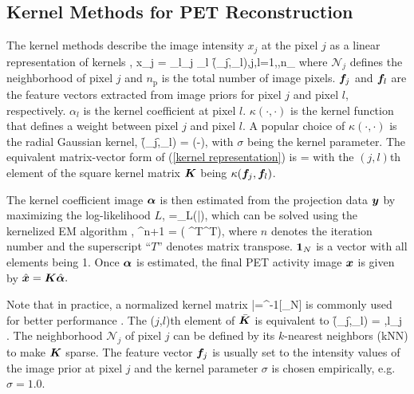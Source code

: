 \documentclass[]{IEEETran}
\newcommand{\np}{n_\mathrm{p}}
\begin{document}
	\subsection{Kernel Methods for PET Reconstruction}
	
	The kernel methods describe the image intensity $x_j$ at the pixel $j$ as a linear representation of kernels \cite{Wang2015},
	\beq
	x_j = \sum_{l\in {}_j} \alpha_l \kappa(\f_j,\f_l),\quad j,l=1,\cdots,\np
	\label{kernel representation}
	\eeq
	where $\mathcal{N}_j$ defines the neighborhood of pixel $j$ and $\np$ is the total number of image pixels. $\bm{f}_j$ and $\bm{f}_l$ are the feature vectors extracted from image priors for pixel $j$ and pixel $l$, respectively.  $\alpha_l$ is the kernel coefficient at pixel $l$. $\kappa(\cdot,\cdot)$ is the kernel function that defines a weight between pixel $j$ and pixel $l$. A popular choice of $\kappa(\cdot,\cdot)$ is the radial Gaussian kernel,
	\beq
	\kappa(\f_j,\f_l) = \big(-\big),
	\label{Gaussian}
	\eeq
	with $\sigma$ being the kernel parameter.
	The equivalent matrix-vector form of (\ref{kernel representation}) is
	\beq
	\x = \K \alp
	\label{eq-km}
	\eeq
	with the $(j,l)$th element of the square kernel matrix $\bm{K}$ being $\kappa(\bm{f}_j,\bm{f}_l)$. 
	
	The kernel coefficient image $\bm{\alpha}$ is then estimated from the projection data $\bm{y}$ by maximizing the log-likelihood $L$,
	\beq
	\hat{\alp} =\arg\max\limits_{\alp {}}L(\y|\K\alp),
	\label{ML-K}
	\eeq
	which can be solved using the kernelized EM algorithm \cite{Wang2015},
	\beq
	\alp^{n+1} = \cdot\left( \K^T\Pm^T\right),
	\label{KEM}
	\eeq
	where $n$ denotes the iteration number and the superscript ``$T$'' denotes matrix transpose. $\bm{1}_{N}$ is a vector with all elements being 1.
	Once $\bm{\alpha}$ is estimated, the final PET activity image $\bm{x}$ is given by
	$
	\hat{\bm{x}} = \bm{K}\hat{\bm{\alpha}}.
	$
	
	Note that in practice, a normalized kernel matrix
	\beq
	\bar{\K}=\diag^{-1}[\K\1_N]\K
	\label{eq-normk}
	\eeq
	is commonly used for better performance \cite{Wang2015}. The ($j$,$l$)th element of $\bar{\bm{K}}$ is equivalent to
	\beq
	\kappa(\f_j,\f_l) = 
	,\quad l\in {}_j .
	\label{Gaussian}
	\eeq
	The neighborhood $\mathcal{N}_j$ of pixel $j$ can be defined by its $k$-nearest neighbors (kNN) \cite{Friedman1977} to make $\bm{K}$ sparse. The feature vector $\bm{f}_j$ is usually set to the intensity values of the image prior at pixel $j$ and the kernel parameter $\sigma$ is chosen empirically, e.g. $\sigma=1.0$. 
	
\end{document}
